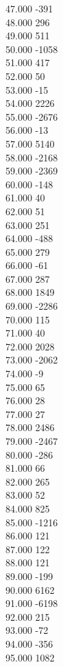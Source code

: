{ 47.000	-391 \\
 48.000	296 \\
 49.000	511 \\
 50.000	-1058 \\
 51.000	417 \\
 52.000	50 \\
 53.000	-15 \\
 54.000	2226 \\
 55.000	-2676 \\
 56.000	-13 \\
 57.000	5140 \\
 58.000	-2168 \\
 59.000	-2369 \\
 60.000	-148 \\
 61.000	40 \\
 62.000	51 \\
 63.000	251 \\
 64.000	-488 \\
 65.000	279 \\
 66.000	-61 \\
 67.000	287 \\
 68.000	1849 \\
 69.000	-2286 \\
 70.000	115 \\
 71.000	40 \\
 72.000	2028 \\
 73.000	-2062 \\
 74.000	-9 \\
 75.000	65 \\
 76.000	28 \\
 77.000	27 \\
 78.000	2486 \\
 79.000	-2467 \\
 80.000	-286 \\
 81.000	66 \\
 82.000	265 \\
 83.000	52 \\
 84.000	825 \\
 85.000	-1216 \\
 86.000	121 \\
 87.000	122 \\
 88.000	121 \\
 89.000	-199 \\
 90.000	6162 \\
 91.000	-6198 \\
 92.000	215 \\
 93.000	-72 \\
 94.000	-356 \\
 95.000	1082 \\
}
